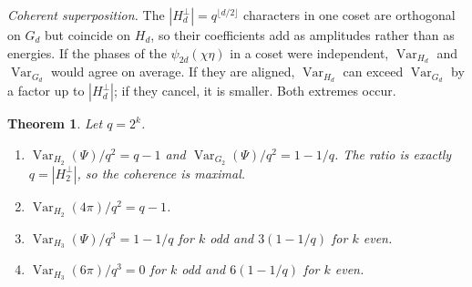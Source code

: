 \documentclass[11pt,a4paper]{amsart}
\newtheorem{theorem}{Theorem}[section]
\theoremstyle{definition}
\theoremstyle{remark}
\newcommand{\Var}{\operatorname{Var}}
\begin{document}
\emph{Coherent superposition.} The $|H_d^\perp|=q^{\lfloor d/2\rfloor}$ characters in one coset are orthogonal on
$G_d$ but coincide on $H_d$, so their coefficients add as amplitudes rather than as energies. If the phases of the
$\psi_{2d}(\chi\eta)$ in a coset were independent, $\Var_{H_d}$ and $\Var_{G_d}$ would agree on average. If they are
aligned, $\Var_{H_d}$ can exceed $\Var_{G_d}$ by a factor up to $|H_d^\perp|$; if they cancel, it is smaller. Both
extremes occur.

\begin{theorem}\label{thm:var23}
Let $q=2^k$.
\begin{enumerate}
\item $\Var_{H_2}(\Psi)/q^2=q-1$ and $\Var_{G_2}(\Psi)/q^2=1-1/q$. The ratio is exactly $q=|H_2^\perp|$, so the
coherence is maximal.
\item $\Var_{H_2}(4\pi)/q^2=q-1$.
\item $\Var_{H_3}(\Psi)/q^3=1-1/q$ for $k$ odd and $3(1-1/q)$ for $k$ even.
\item $\Var_{H_3}(6\pi)/q^3=0$ for $k$ odd and $6(1-1/q)$ for $k$ even.
\end{enumerate}
\end{theorem}
\end{document}
